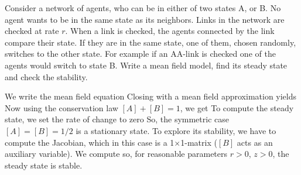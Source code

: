 Consider a network of agents, who can be in either of two states A, or B. No agent wants to be in the same state as its neighbors. Links in the network are checked at rate $r$. When a link is checked, the agents connected by the link compare their state. If they are in the same state, one of them, chosen randomly, switches to the other state. For example if an AA-link is checked one of the agents would switch to state B. Write a mean field model, find its steady state and check the stability. 

\solution

We write the mean field equation
Closing with a mean field approximation yields
Now using the conservation law $[A]+[B]=1$, we get 
To compute the steady state, we set the rate of change to zero
So, the symmetric case $[A]=[B]=1/2$ is a stationary state. To explore its stability, 
we have to compute the Jacobian, which in this case is a 1$\times$1-matrix ($[B]$ acts as an 
auxiliary variable). We compute
so, for reasonable parameters $r>0$, $z>0$, the steady state is stable.


